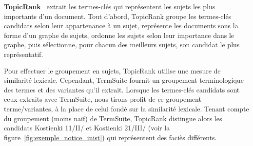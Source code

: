     \textbf{TopicRank}~\cite{bougouin2013topicrank} extrait les termes-clés qui
    représentent les sujets les plus importants d'un document. Tout d'abord,
    TopicRank groupe les termes-clés candidats selon leur appartenance à un
    sujet, représente les documents sous la forme d'un graphe de sujets, ordonne
    les sujets selon leur importance dans le graphe, puis sélectionne, pour
    chacun des meilleurs sujets, son candidat le plus représentatif.
    
    Pour effectuer le groupement en sujets, TopicRank utilise une mesure de
    similarité lexicale. Cependant, TermSuite fournit un groupement
    terminologique des termes et des variantes qu'il extrait. Lorsque les
    termes-clés candidats sont ceux extraits avec TermSuite, nous tirons profit
    de ce groupement terme/variantes, à la place de celui fondé sur la
    similarité lexicale. Tenant compte du groupement (moins naïf) de TermSuite,
    TopicRank distingue alors les candidats \og{}Kostienki 11/II/\fg{} et
    \og{}Kostienki 21/III/\fg{} (voir la figure~\ref{fig:exemple_notice_inist})
    qui représentent des faciès différents.

